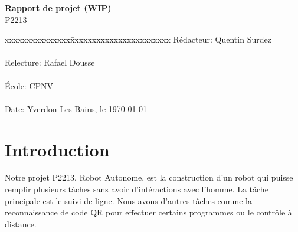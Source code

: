 \documentclass[
	a4paper,									%
	11pt,										%
	twoside,									%
	openright,									%
	notitlepage,									%
	parskip=half,								%
]{scrreprt}										%
\begin{document}
\begin{titlepage}
	\vspace{3cm}

	\fontsize{30pt}{32pt}\selectfont 
	\noindent \textbf{Rapport de projet (WIP)} \\

	\fontsize{18pt}{20pt}\selectfont\vspace{0.3em} P2213 \\

	\vspace{4cm}
	\fontsize{12pt}{15pt}\selectfont
	\begin{tabbing}
		xxxxxxxxxxxxxxx\=xxxxxxxxxxxxxxxxxxxxxxx \kill
		Rédacteur:\> Quentin Surdez\\ \\
		Relecture:\> Rafael Dousse\\ \\
		École:\> CPNV\\ \\
		Date:\> Yverdon-Les-Bains, le \today \\
	\end{tabbing}
\end{titlepage}

\tableofcontents

\listoffigures									%
\listoftables									%
\cleardoublepage

\setcounter{page}{1}

\chapter{Introduction}

Notre projet P2213, Robot Autonome, est la construction d'un robot qui puisse remplir plusieurs tâches
sans avoir d'intéractions avec l'homme. La tâche principale est le suivi de ligne. Nous avons d'autres 
tâches comme la reconnaissance de code QR pour effectuer certains programmes ou le contrôle à distance. \par
\end{document}
